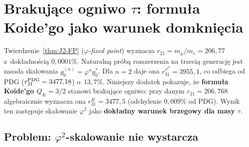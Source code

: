 \section{Brakuj\k{a}ce ogniwo $\tau$: formu\l{}a Koide'go jako warunek
  domkni\k{e}cia}%
\label{app:T-koide}

Twierdzenie~\ref{thm:J2-FP} (\textit{$\varphi$-fixed point}) wyznacza
$r_{21} = m_\mu/m_e = 206{,}77$ z~dok\l{}adno\'sci\k{a} $0{,}0001\%$.
Naturaln\k{a} prób\k{a} rozszerzenia na trzeci\k{a} generacj\k{e} jest
zasada skalowania $g_0^{(n)} = \varphi^n g_0^*$.
Dla $n = 2$ daje ona $r_{31}^{\varphi^2} = 3955{,}1$,
co odbiega od PDG ($r_{31}^{\rm PDG} = 3477{,}18$) o~$13{,}7\%$.
Niniejszy dodatek pokazuje, \.ze \textbf{formu\l{}a Koide'go
$Q_K = 3/2$} stanowi brakuj\k{a}ce ogniwo: przy danym
$r_{21} = 206{,}768$ algebraicznie wyznacza ona
$r_{31}^K = 3477{,}5$ (odchylenie $0{,}009\%$ od PDG).
Wynik ten zast\k{e}puje skalowanie $\varphi^2$ jako
\textbf{dok\l{}adny warunek brzegowy dla masy $\tau$}.

\medskip
\noindent{}
\medskip

\subsection{Problem: $\varphi^2$-skalowanie nie wystarcza}%
\label{app:T-problem}

